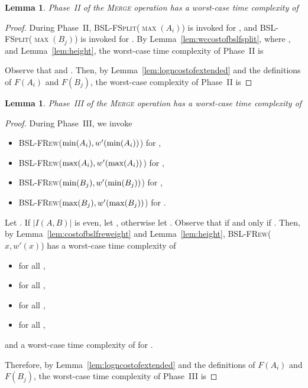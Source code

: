 \documentclass[11pt]{article}
\newcommand{\kwUnion}{Merge}
\newcommand{\Union}{\mbox{\textsc{\kwUnion{}}}}
\newcommand{\Bslfsplx}[1]{\mbox{\textsc{BSL-FSplit(\ensuremath{#1})}}}
\newcommand{\Bslfrewx}[2]{\mbox{\textsc{BSL-FRew(\ensuremath{#1,#2})}}}
\newcommand{\intmax}[1]{\ensuremath{\max(\intl #1)}}
\newcommand{\intmin}[1]{\ensuremath{\min(\intl #1)}}
\newcommand{\intnum}[2]{\ensuremath{|I(\set{#1},\set{#2})|}}
\newcommand{\intl}[1]{\ensuremath{#1}}
\newcommand{\nodenewweight}[1]{{\ensuremath{w'(\node #1)}}}
\newcommand{\node}[1]{\ensuremath{#1}}
\newcommand{\set}[1]{\ensuremath{#1}}
\newcommand{\intfun}[1]{\ensuremath{F(\intl #1)}}
\newcounter{count}
\newtheorem{lemma}[count]{Lemma}
\begin{document}
\begin{lemma} 
\label{lem:phasetwo} 
Phase~II of the \Union{} operation has a worst-case time complexity of  
\end{lemma} 

\begin{proof} 
During Phase~II, \Bslfsplx{\intmax{A_i}} is invoked for , and \Bslfsplx{\intmax{B_j}} is invoked for . 
By Lemma~\ref{lem:wccostofbslfsplit}, 
where ,
and Lemma~\ref{lem:height}, the worst-case time complexity of Phase~II is 
 
 
Observe that  and . Then, by Lemma~\ref{lem:logncostofextended} and the definitions of \intfun{A_i} and \intfun{B_j}, the worst-case complexity of Phase~II is 
 
\end{proof} 


\begin{lemma} 
\label{lem:phasethree} 
Phase~III of the \Union{} operation has a worst-case time complexity of  
\end{lemma} 

\begin{proof} 
During Phase~III, we invoke 

\begin{itemize} 
\item \Bslfrewx{\intmin{A_i}}{\nodenewweight{\intmin{A_i}}} \quad for  , 
\item \Bslfrewx{\intmax{A_i}}{\nodenewweight{\intmax{A_i}}} \quad for  , 
\item \Bslfrewx{\intmin{B_j}}{\nodenewweight{\intmin{B_j}}} \quad for  , 
\item \Bslfrewx{\intmax{B_j}}{\nodenewweight{\intmax{B_j}}} \quad for  . 
\end{itemize} 



Let . If \intnum{A}{B} is even, let , otherwise let . Observe that  if and only if . 
Then, by Lemma~\ref{lem:costofbslfreweight} and Lemma~\ref{lem:height}, \Bslfrewx{x}{\nodenewweight{x}} has a worst-case time complexity of 
\begin{itemize} 
\item  for all 
, 
\item  for all 
, 
\item  for all 
, 
\item  for all 
, 
\end{itemize} 
and a worst-case time complexity of  for . 

Therefore, by Lemma~\ref{lem:logncostofextended} and the definitions of \intfun{A_i} and \intfun{B_j}, the worst-case time complexity of Phase~III is  

\end{proof} 
\end{document}
